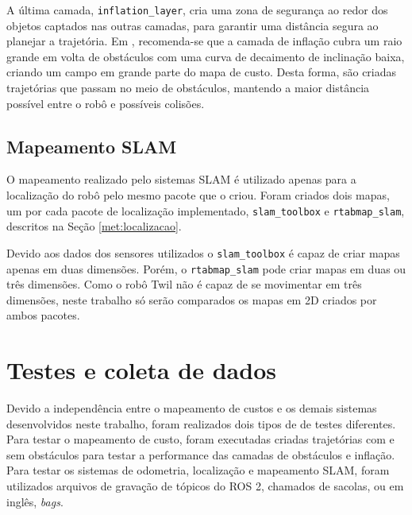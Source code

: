 \documentclass[repeatfields,xlists,xpacks,oneside,yearsonly]{ufrgscca}
\begin{document}
A última camada, \texttt{inflation\_layer}, cria uma zona de
segurança ao redor dos objetos captados nas outras camadas, para
garantir uma distância segura ao planejar a trajetória. Em
\textcite{ros_tuning_guide}, recomenda-se que a camada de inflação
cubra um raio grande em volta de obstáculos com uma curva de
decaimento de inclinação baixa, criando um campo em grande parte do
mapa de custo. Desta forma, são criadas trajetórias que passam no
meio de obstáculos, mantendo a maior distância possível entre o robô
e possíveis colisões.


\subsection{Mapeamento SLAM}

O mapeamento realizado pelo sistemas SLAM é utilizado apenas para a
localização do robô pelo mesmo pacote que o criou. Foram criados dois
mapas, um por cada pacote de localização implementado,
\texttt{slam\_toolbox} e \texttt{rtabmap\_slam}, descritos na Seção
\ref{met:localizacao}.

Devido aos dados dos sensores utilizados o \texttt{slam\_toolbox} é
capaz de criar mapas apenas em duas dimensões. Porém, o
\texttt{rtabmap\_slam} pode criar mapas em duas ou três dimensões.
Como o robô Twil não é capaz de se movimentar em três dimensões,
neste trabalho só serão comparados os mapas em 2D criados por ambos
pacotes.


\section{Testes e coleta de dados}
\label{met:testes}

Devido a independência entre o mapeamento de custos e os demais
sistemas desenvolvidos neste trabalho, foram realizados dois tipos de
de testes diferentes. Para testar o mapeamento de custo, foram
executadas criadas trajetórias com e sem obstáculos para testar a
performance das camadas de obstáculos e inflação. Para testar os
sistemas de odometria, localização e mapeamento SLAM, foram
utilizados arquivos de gravação de tópicos do ROS 2, chamados de
sacolas, ou em inglês, \textit{bags}.
\end{document}
